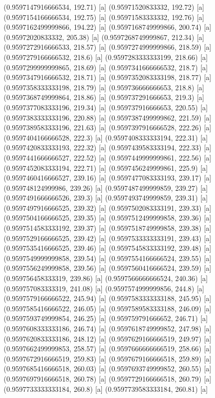 {{{(0.9597147916666534, 192.71) [a] 
(0.95971520833332, 192.72) [a] 
(0.9597154166666534, 192.75) [a] 
(0.95971583333332, 192.76) [a] 
(0.9597162499999866, 194.22) [a] 
(0.9597168749999866, 200.74) [a] 
(0.95972020833332, 205.38) [a] 
(0.9597268749999867, 212.34) [a] 
(0.9597272916666533, 218.57) [a] 
(0.9597274999999866, 218.59) [a] 
(0.9597279166666532, 218.6) [a] 
(0.9597283333333199, 218.66) [a] 
(0.9597299999999865, 218.69) [a] 
(0.9597341666666532, 218.7) [a] 
(0.9597347916666532, 218.71) [a] 
(0.9597352083333198, 218.77) [a] 
(0.9597358333333198, 218.79) [a] 
(0.959736666666653, 218.8) [a] 
(0.9597368749999864, 218.86) [a] 
(0.959737291666653, 219.3) [a] 
(0.9597377083333196, 219.34) [a] 
(0.959737916666653, 220.55) [a] 
(0.9597383333333196, 220.88) [a] 
(0.9597387499999862, 221.59) [a] 
(0.9597389583333196, 221.63) [a] 
(0.9597397916666528, 222.26) [a] 
(0.9597404166666528, 222.3) [a] 
(0.9597408333333194, 222.31) [a] 
(0.9597420833333193, 222.32) [a] 
(0.9597439583333194, 222.33) [a] 
(0.9597441666666527, 222.52) [a] 
(0.9597449999999861, 222.56) [a] 
(0.9597452083333194, 222.71) [a] 
(0.9597456249999861, 225.9) [a] 
(0.9597460416666527, 239.16) [a] 
(0.9597477083333193, 239.17) [a] 
(0.959748124999986, 239.26) [a] 
(0.9597487499999859, 239.27) [a] 
(0.9597491666666526, 239.3) [a] 
(0.9597493749999859, 239.31) [a] 
(0.9597497916666525, 239.32) [a] 
(0.9597502083333191, 239.33) [a] 
(0.9597504166666525, 239.35) [a] 
(0.9597512499999858, 239.36) [a] 
(0.9597514583333192, 239.37) [a] 
(0.9597518749999858, 239.38) [a] 
(0.9597529166666525, 239.42) [a] 
(0.9597533333333191, 239.43) [a] 
(0.9597535416666525, 239.46) [a] 
(0.9597545833333192, 239.48) [a] 
(0.9597549999999858, 239.54) [a] 
(0.9597554166666524, 239.55) [a] 
(0.9597556249999858, 239.56) [a] 
(0.9597560416666524, 239.59) [a] 
(0.959756458333319, 239.86) [a] 
(0.9597566666666524, 240.36) [a] 
(0.959757083333319, 241.08) [a] 
(0.9597574999999856, 244.8) [a] 
(0.9597579166666522, 245.94) [a] 
(0.9597583333333188, 245.95) [a] 
(0.9597585416666522, 246.05) [a] 
(0.9597589583333188, 246.09) [a] 
(0.9597593749999854, 246.25) [a] 
(0.959759791666652, 246.71) [a] 
(0.9597608333333186, 246.74) [a] 
(0.9597618749999852, 247.98) [a] 
(0.9597620833333186, 248.12) [a] 
(0.9597629166666519, 249.97) [a] 
(0.9597662499999853, 258.57) [a] 
(0.9597666666666519, 258.66) [a] 
(0.9597672916666519, 259.83) [a] 
(0.9597679166666518, 259.89) [a] 
(0.9597685416666518, 260.03) [a] 
(0.9597693749999852, 260.55) [a] 
(0.9597697916666518, 260.78) [a] 
(0.9597729166666518, 260.79) [a] 
(0.9597733333333184, 260.8) [a] 
(0.9597739583333184, 260.81) [a] 
}}}
